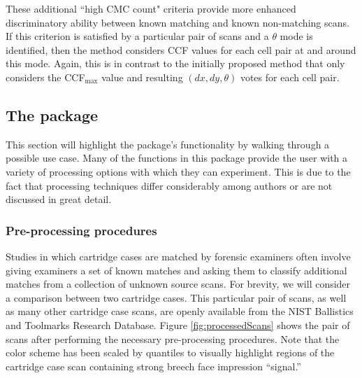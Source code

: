 These additional ``high CMC count" criteria provide more enhanced
discriminatory ability between known matching and known non-matching
scans. If this criterion is satisfied by a particular pair of scans and
a \(\theta\) mode is identified, then the method considers CCF values
for each cell pair at and around this mode. Again, this is in contrast
to the initially proposed method that only considers the CCF\(_{\max}\)
value and resulting \((dx,dy,\theta)\) votes for each cell pair.

\hypertarget{the-package}{%
\subsection{\texorpdfstring{The 
package}{The  package}}\label{the-package}}

This section will highlight the  package's functionality by
walking through a possible use case. Many of the functions in this
package provide the user with a variety of processing options with which
they can experiment. This is due to the fact that processing techniques
differ considerably among authors or are not discussed in great detail.

\hypertarget{pre-processing-procedures}{%
\subsubsection{Pre-processing
procedures}\label{pre-processing-procedures}}

Studies in which cartridge cases are matched by forensic examiners often
involve giving examiners a set of known matches and asking them to
classify additional matches from a collection of unknown source scans.
For brevity, we will consider a comparison between two cartridge cases.
This particular pair of scans, as well as many other cartridge case
scans, are openly available from the NIST Ballistics and Toolmarks
Research Database. Figure \ref{fig:processedScans} shows the pair of
scans after performing the necessary pre-processing procedures. Note
that the color scheme has been scaled by quantiles to visually highlight
regions of the cartridge case scan containing strong breech face
impression ``signal.''

